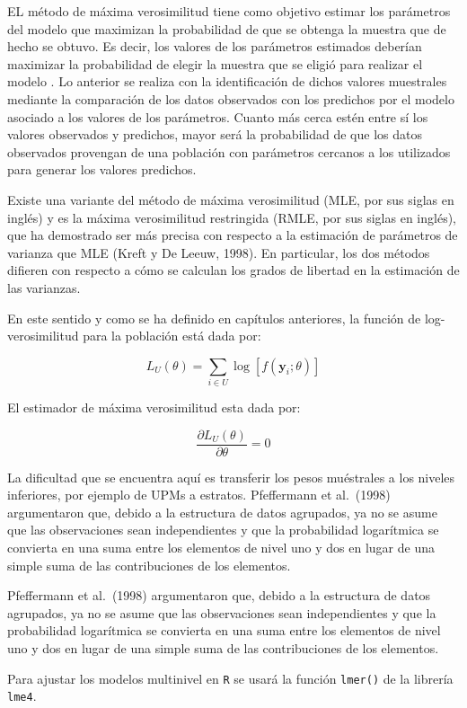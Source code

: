 \documentclass[
  12pt,
]{book}
\begin{document}
EL método de máxima verosimilitud tiene como objetivo estimar los parámetros del modelo que maximizan la probabilidad de que se obtenga la muestra que de hecho se obtuvo. Es decir, los valores de los parámetros estimados deberían maximizar la probabilidad de elegir la muestra que se eligió para realizar el modelo . Lo anterior se realiza con la identificación de dichos valores muestrales mediante la comparación de los datos observados con los predichos por el modelo asociado a los valores de los parámetros. Cuanto más cerca estén entre sí los valores observados y predichos, mayor será la probabilidad de que los datos observados provengan de una población con parámetros cercanos a los utilizados para generar los valores predichos.

Existe una variante del método de máxima verosimilitud (MLE, por sus siglas en inglés) y es la máxima verosimilitud restringida (RMLE, por sus siglas en inglés), que ha demostrado ser más precisa con respecto a la estimación de parámetros de varianza que MLE (Kreft y De Leeuw, 1998). En particular, los dos métodos difieren con respecto a cómo se calculan los grados de libertad en la estimación de las varianzas.

En este sentido y como se ha definido en capítulos anteriores, la función de log-verosimilitud para la población está dada por:

\[
L_{U}\left(\theta\right)=\sum_{i\in U}\log\left[f\left(\boldsymbol{y}_{i};\theta\right)\right]
\]

El estimador de máxima verosimilitud esta dada por:

\[
\frac{\partial L_{U}\left(\theta\right)}{\partial\theta}=0
\]

La dificultad que se encuentra aquí es transferir los pesos muéstrales a los niveles inferiores, por ejemplo de UPMs a estratos. Pfeffermann et al.~(1998) argumentaron que, debido a la estructura de datos agrupados, ya no se asume que las observaciones sean independientes y que la probabilidad logarítmica se convierta en una suma entre los elementos de nivel uno y dos en lugar de una simple suma de las contribuciones de los elementos.

Pfeffermann et al.~(1998) argumentaron que, debido a la estructura de datos agrupados, ya no se asume que las observaciones sean independientes y que la probabilidad logarítmica se convierta en una suma entre los elementos de nivel uno y dos en lugar de una simple suma de las contribuciones de los elementos.

Para ajustar los modelos multinivel en \texttt{R} se usará la función \texttt{lmer()} de la librería \texttt{lme4}.
\end{document}
